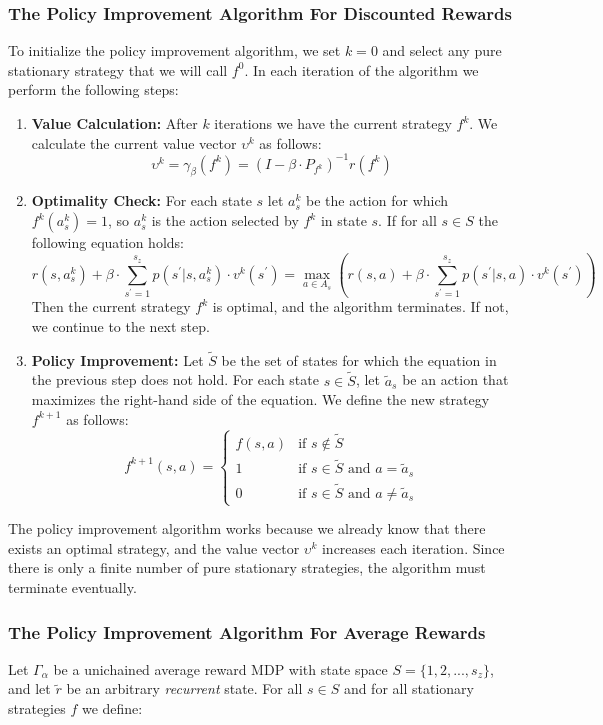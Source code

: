 \documentclass[12pt]{article}
\begin{document}
\newpage
\subsubsection{The Policy Improvement Algorithm For Discounted Rewards}
To initialize the policy improvement algorithm, we set $k = 0$ and select any pure stationary strategy that we will call $f^0$.
In each iteration of the algorithm we perform the following steps:

\begin{enumerate}
    \item \textbf{Value Calculation:} After $k$ iterations we have the current strategy $f^k$. We calculate the current value vector $\upsilon^k$ as follows:
    \[ \upsilon^k = \gamma_\beta(f^k) = (I - \beta \cdot P_{f^k})^{-1} r(f^k) \]
    \item \textbf{Optimality Check:} For each state $s$ let $a_s^k$ be the action for which $f^k(a_s^k) = 1$, so $a_s^k$ is the action selected by $f^k$ in state $s$. If for all $s \in S$ the following equation holds:
    \[ r(s, a_s^k) + \beta \cdot \sum_{s^\prime = 1}^{s_z} p(s^\prime | s, a_s^k) \cdot v^k(s^\prime) = \max_{a \in A_s} \left( r(s, a) + \beta \cdot \sum_{s^\prime = 1}^{s_z} p(s^\prime | s, a) \cdot v^k(s^\prime) \right) \]
    Then the current strategy $f^k$ is optimal, and the algorithm terminates. If not, we continue to the next step.
    \item \textbf{Policy Improvement:} Let $\tilde{S}$ be the set of states for which the equation in the previous step does not hold. For each state $s \in \tilde{S}$, let $\tilde{a}_s$ be an action that maximizes the right-hand side of the equation. We define the new strategy $f^{k + 1}$ as follows:
    \[ f^{k + 1}(s, a) = \begin{cases}
        f(s, a) & \text{if } s \notin \tilde{S} \\
        1 & \text{if } s \in \tilde{S} \text{ and } a = \tilde{a}_s \\
        0 & \text{if } s \in \tilde{S} \text{ and } a \neq \tilde{a}_s
    \end{cases} \]
\end{enumerate}

\noindent
The policy improvement algorithm works because we already know that there exists an optimal strategy, and the value vector $\upsilon^k$ increases each iteration.
Since there is only a finite number of pure stationary strategies, the algorithm must terminate eventually.

\subsubsection{The Policy Improvement Algorithm For Average Rewards}
Let $\Gamma_\alpha$ be a unichained average reward MDP with state space $S = \{ 1, 2, ... , s_z \}$, and let $\tilde{r}$ be an arbitrary \textit{recurrent} state.
For all $s \in S$ and for all stationary strategies $f$ we define:
\end{document}
